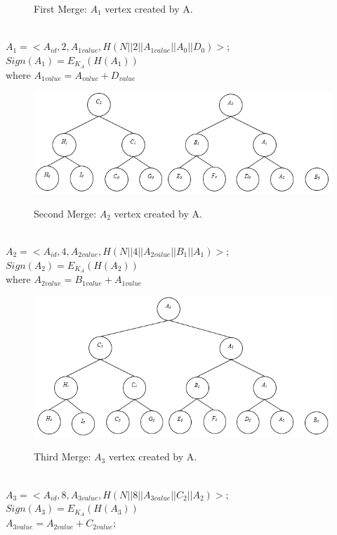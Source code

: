 \begin{exmp}
\begin{figure}[h!]
					\caption{First Merge: $A_{1}$ vertex created by A.}
					\label{fig:commitment-tree-example-2}
				\end{figure}\\
				$A_{1} = <A_{id}, 2, A_{1value}, H(N||2||A_{1value}||A_{0}||D_{0})>$; $Sign(A_{1}) = E_{K_{A}}(H(A_{1}))$\\
				where $A_{1value} = A_{value} + D_{value} $
				\begin{figure}[h!]
					\centering
					\includegraphics[scale = 1]{images/commitment-tree-example-3.png}\\
					\caption{Second Merge: $A_{2}$ vertex created by A.}
					\label{fig:commitment-tree-example-3}
				\end{figure}\\
				$A_{2} = <A_{id}, 4, A_{2value}, H(N||4||A_{2value}||B_{1}||A_{1}) >$; $Sign(A_{2}) = E_{K_{A}}(H({A_{2}}))$\\
				where $A_{2value} = B_{1value} + A_{1value} $
				\begin{figure}[h!]
					\centering
					\includegraphics[scale = 1]{images/commitment-tree-example-4.png}\\
					\caption{Third Merge: $A_{3}$ vertex created by A.}
					\label{fig:commitment-tree-example-4}
				\end{figure}\\
				$A_{3} = <A_{id},8, A_{3value},H(N||8||A_{3value}||C_{2}||A_{2})>$; $Sign(A_{3}) = E_{K_{A}}(H(A_{3}))$\\
				$A_{3value} = A_{2value} + C_{2value}$;
			\end{exmp}


